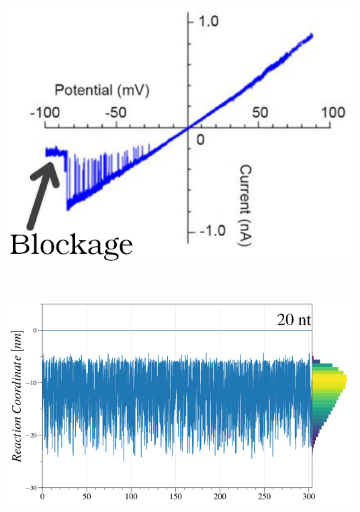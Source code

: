 \begin{figure}[ht!]
  \begin{centering}
  \begin{subfigure}[t]{\dimexpr.3\linewidth-1.3em\relax}
  \centering
  \vspace{0.15cm}
  \hbox{\hspace{0.35cm}
  \includegraphics[width=1.05\linewidth,valign=t]{Figures/IV-80.png}}
  \end{subfigure}%
  \hspace{-0.5cm}
  \begin{subfigure}[t]{\dimexpr.46\linewidth-1.3em\relax}
  \centering
  \hbox{\hspace{0.56cm}
  \includegraphics[width=.95\linewidth,valign=t]{Figures/MR-80.png}}
  \end{subfigure}%
  \hspace{.5cm}

\end{centering}
\end{figure}
